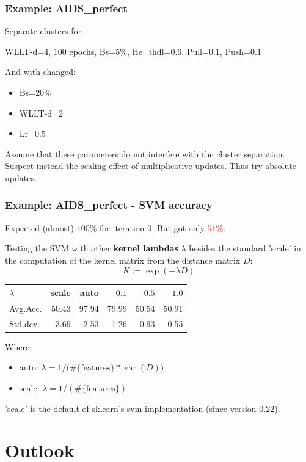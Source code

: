 \begin{frame}\frametitle{Example: AIDS\_perfect}
	Separate clusters for:\\
	\begin{center}
		WLLT-d=$4$, $100$ epochs, Bs=$5\%$, He\_thdl=$0.6$, Pull=$0.1$, Push=$0.1$
	\end{center}
	And with changed:
	\begin{itemize}
		\item Bs=$20\%$
		\item WLLT-d=$2$
		\item Lr=$0.5$
	\end{itemize}	
	Assume that these parameters do not interfere with the cluster separation.\\
	Suspect instead the scaling effect of multiplicative updates. Thus try absolute updates.
\end{frame}


\begin{frame}\frametitle{Example: AIDS\_perfect - SVM accuracy}
	Expected (almost) $100\%$ for iteration 0. But got only \textcolor{red}{$51\%$}.\newline
	
	Testing the SVM with other \textbf{kernel lambdas} $\lambda$ besides the standard 'scale' in the computation of the kernel matrix from the distance matrix $D$:
	\[ K := \exp(-\lambda D) \]
	\begin{center}\begin{tabular}{l|r r r r r}
		$\lambda$ & scale 	& \textbf{auto} & $0.1$ & $0.5$ & $1.0$\\ \hline
		Avg.Acc.  & $50.43$ & 97.94 & 79.99 & 50.54 &  50.91\\
		Std.dev.  &  $3.69$ &  2.53 &  1.26 &  0.93 &  0.55
	\end{tabular}\end{center}
	Where:
	\begin{itemize}
		\item auto:  $\lambda = 1 / \big(\#\{\text{features}\} * \operatorname{var}(D)\big)$
		\item scale: $\lambda = 1 / (\#\{\text{features}\})$ 
	\end{itemize}
	'scale' is the default of sklearn's svm implementation (since version $0.22$).
\end{frame}

\section{Outlook}

